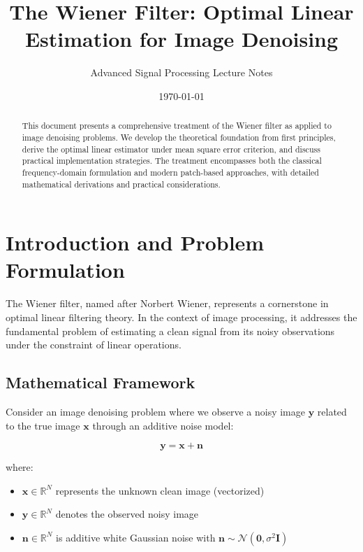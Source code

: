 \documentclass[12pt]{article}
\title{The Wiener Filter: Optimal Linear Estimation for Image Denoising}
\author{Advanced Signal Processing Lecture Notes}
\date{\today}
\renewcommand{\vec}[1]{\mathbf{#1}}
\theoremstyle{definition}
\begin{document}
\maketitle

\begin{abstract}
    This document presents a comprehensive treatment of the Wiener filter as applied to image denoising problems. We develop the theoretical foundation from first principles, derive the optimal linear estimator under mean square error criterion, and discuss practical implementation strategies. The treatment encompasses both the classical frequency-domain formulation and modern patch-based approaches, with detailed mathematical derivations and practical considerations.
\end{abstract}

\tableofcontents
\newpage


\section{Introduction and Problem Formulation}
\label{sec:introduction}

The Wiener filter, named after Norbert Wiener, represents a cornerstone in optimal linear filtering theory. In the context of image processing, it addresses the fundamental problem of estimating a clean signal from its noisy observations under the constraint of linear operations.

\subsection{Mathematical Framework}
\label{subsec:framework}

Consider an image denoising problem where we observe a noisy image $\vec{y}$ related to the true image $\vec{x}$ through an additive noise model:

\begin{equation}
    \label{eq:noise_model}
    \vec{y} = \vec{x} + \vec{n}
\end{equation}

where:
\begin{itemize}[leftmargin=*]
    \item $\vec{x} \in \mathbb{R}^{N}$ represents the unknown clean image (vectorized)
    \item $\vec{y} \in \mathbb{R}^{N}$ denotes the observed noisy image
    \item $\vec{n} \in \mathbb{R}^{N}$ is additive white Gaussian noise with $\vec{n} \sim \mathcal{N}(\vec{0}, \sigma^2 \mathbf{I})$
\end{itemize}
\end{document}
